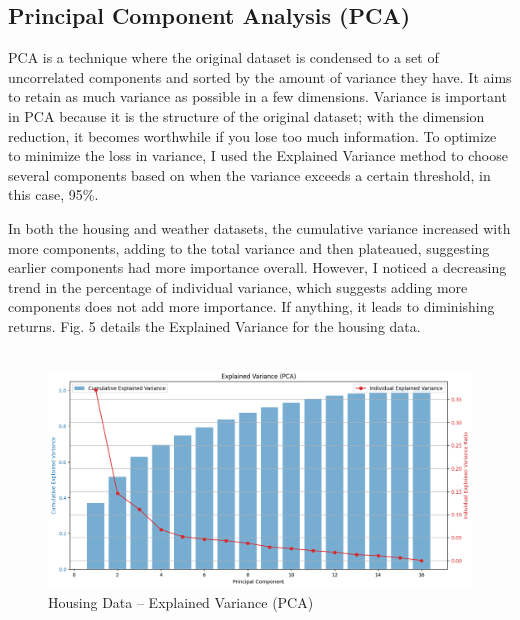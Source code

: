 \documentclass[conference]{IEEEtran}
\begin{document}
\subsection{Principal Component Analysis (PCA)}
\par PCA is a technique where the original dataset is condensed to a set of uncorrelated components and sorted by the amount of variance they have. It aims to retain as much variance as possible in a few dimensions. Variance is important in PCA because it is the structure of the original dataset; with the dimension reduction, it becomes worthwhile if you lose too much information. To optimize to minimize the loss in variance, I used the Explained Variance method to choose several components based on when the variance exceeds a certain threshold, in this case, 95\%.
\par In both the housing and weather datasets, the cumulative variance increased with more components, adding to the total variance and then plateaued, suggesting earlier components had more importance overall. However, I noticed a decreasing trend in the percentage of individual variance, which suggests adding more components does not add more importance. If anything, it leads to diminishing returns. Fig. 5 details the Explained Variance for the housing data.\\\\
\begin{figure}
    \centering
    \includegraphics[width=1.0\linewidth]{figures//housing_figures/step_2a.png}
    \caption{Housing Data -- Explained Variance (PCA)}
    \label{fig:5_housing_ExpVariance
}
\end{figure}
\end{document}
